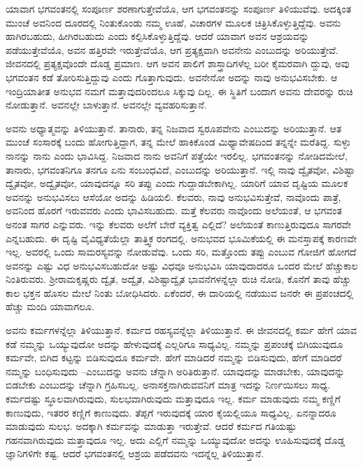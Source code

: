 ಯಾವಾಗ ಭಗವಂತನಲ್ಲಿ ಸಂಪೂರ್ಣ ಶರಣಾಗುತ್ತೇವೆಯೊ, ಆಗ ಭಗವಂತನನ್ನು ಸಂಪೂರ್ಣ ತಿಳಿಯುವೆವು. ಅದಕ್ಕಿಂತ ಮುಂಚೆ ಅವನಿಂದ ದೂರದಲ್ಲಿ ನಿಂತುಕೊಂಡು ನಮ್ಮ ಊಹೆ, ವಿಚಾರಗಳ ಮೂಲಕ ಚಿತ್ರಿಸಿಕೊಳ್ಳುತ್ತಿದ್ದೆವು. ಅವನು ಹಾಗಿರಬಹುದು, ಹೀಗಿರಬಹುದು ಎಂದು ಕಲ್ಪಿಸಿಕೊಳ್ಳುತ್ತಿದ್ದೆವು. ಆದರೆ ಯಾವಾಗ ಅವನ ಆಶ್ರಯವನ್ನು ಪಡೆಯುತ್ತೇವೆಯೊ, ಅವನ ಹತ್ತಿರವೇ ಇರುತ್ತೇವೆಯೊ, ಆಗ ಪ್ರತ್ಯಕ್ಷವಾಗಿ ಅವನೇನು ಎಂಬುದನ್ನು ಅರಿಯುತ್ತೇವೆ. ಜೀವನದಲ್ಲಿ ಪ್ರತ್ಯಕ್ಷವೊಂದೇ ದೊಡ್ಡ ಪ್ರಮಾಣ. ಆಗ ಅವನ ಪಾಲಿಗೆ ಶಾಸ್ತ್ರಾದಿಗಳೆಲ್ಲ ಬರೀ ಕೈಮರವಾಗಿ ದ್ದುವು, ಅವು ಭಗವಂತನ ಕಡೆ ತೋರಿಸುತ್ತಿದ್ದುವು ಎಂದು ಗೊತ್ತಾಗುವುದು. ಅವನೇನೋ ಅದನ್ನು ನಾವು ಅನುಭವಿಸಬೇಕು. ಆ ಇಂದ್ರಿಯಾತೀತ ಅನುಭವ ನಮಗೆ ಮತ್ತಾವುದರಿಂದಲೂ ಸಿಕ್ಕುವು ದಿಲ್ಲ. ಈ ಸ್ಥಿತಿಗೆ ಬಂದಾಗ ಅವನು ದೇವರನ್ನು ರುಚಿ ನೋಡುತ್ತಾನೆ. ಅವನಲ್ಲೇ ಬಾಳುತ್ತಾನೆ. ಅವನಲ್ಲೇ ವ್ಯವಹರಿಸುತ್ತಾನೆ.

ಅವನು ಅಧ್ಯಾತ್ಮವನ್ನು ತಿಳಿಯುತ್ತಾನೆ. ತಾನಾರು, ತನ್ನ ನಿಜವಾದ ಸ್ವರೂಪವೇನು ಎಂಬು\-ದನ್ನು ಅರಿಯುತ್ತಾನೆ. ಆತ ಮುಂಚೆ ಸಂಸಾರಕ್ಕೆ ಬಂದು ಹೋಗುತ್ತಿದ್ದಾಗ, ತನ್ನ ಮೇಲೆ ಹಾಕಿಕೊಂಡ ಮಿಥ್ಯಾವೇಷದಿಂದ ತನ್ನನ್ನೇ ಮರೆತಿದ್ದ. ಸುಳ್ಳು ನಾನನ್ನು ನಾನು ಎಂದು ಭಾವಿಸಿದ್ದ. ನಿಜವಾದ ನಾನು ಅವನಿಗೆ ಪತ್ತೆಯೇ ಇರಲಿಲ್ಲ. ಭಗವಂತನನ್ನು ನೋಡಿದಮೇಲೆ, ತಾನಾರು, ಭಗವಂತನಿಗೂ ತನಗೂ ಏನು ಸಂಬಂಧವಿದೆ, ಎಂಬುದನ್ನು ಅರಿಯುತ್ತಾನೆ. ಇಲ್ಲಿ ನಾವು ದ್ವೈತವೋ, ವಿಶಿಷ್ಟಾ ದ್ವೈತವೋ, ಅದ್ವೈತವೋ, ಯಾವುದನ್ನೂ ಸರಿ ತಪ್ಪು ಎಂದು ಗುದ್ದಾಡಬೇಕಾಗಿಲ್ಲ. ಯಾರಿಗೆ ಯಾವ ದೃಷ್ಟಿಯ ಮೂಲಕ ಅವನನ್ನು ಅನುಭವಿಸಲು ಆಸೆಯೋ ಅದನ್ನು ಹಿಡಿಯಲಿ. ಕೆಲವರು, ನಾವು ಅನುಭವಿಸುತ್ತೇವೆ, ನಾವೊಂದು ಪಾತ್ರೆ, ಅವನಿಂದ ಹೊರಗೆ ಇರುವವರು ಎಂದು ಭಾವಿಸಬಹುದು. ಮತ್ತೆ ಕೆಲವರು ನಾವೊಂದು ಅಲೆಯಂತೆ, ಆ ಭಗವಂತ ಅನಂತ ಸಾಗರ ಎನ್ನುವರು. ಇನ್ನು ಕೆಲವರು ಅಲೆಗೆ ಬೇರೆ ವ್ಯಕ್ತಿತ್ವ ಎಲ್ಲಿದೆ? ಅಲೆಯಂತೆ ಕಾಣುತ್ತಿರುವುದೂ ಸಾಗರವೇ ಎನ್ನಬಹುದು. ಈ ದೃಷ್ಟಿ ವೈವಿಧ್ಯತೆಯೆಲ್ಲಾ ತಾತ್ತ್ವಿಕ ರಂಗದಲ್ಲಿ. ಅನುಭವದ ಭೂಮಿಕೆಯಲ್ಲಿ ಈ ಮನಸ್ತಾಪಕ್ಕೆ ಕಾರಣವೇ ಇಲ್ಲ. ಅವರಲ್ಲಿ ಒಂದು ಸಾಮರಸ್ಯವನ್ನು ನೋಡುವೆವು. ಒಂದು ಸರಿ, ಮತ್ತೊಂದು ತಪ್ಪು ಎಂಬುವ ಗೋಜಿಗೆ ಹೋಗದೆ ಅವನನ್ನು ಎಷ್ಟು ವಿಧ ಅನುಭವಿಸಬಹುದೋ ಅಷ್ಟು ವಿಧವೂ ಅನುಭವಿಸಿ ಯಾವುದಾದರೂ ಒಂದರ ಮೇಲೆ ಹೆಚ್ಚುಕಾಲ ನಿಂತಿರುವರು. ಶ‍್ರೀರಾಮಕೃಷ್ಣರು ದ್ವೈತ, ಅದ್ವೈತ, ವಿಶಿಷ್ಟಾದ್ವೈತ ಭಾವನೆಗಳನ್ನೆಲ್ಲಾ ರುಚಿ ನೋಡಿ, ಕೊನೆಗೆ ತಾವು ಹೆಚ್ಚು ಕಾಲ ಭಕ್ತನ ಹೊಸಲ ಮೇಲೆ ನಿಂತು ಬೋಧಿಸಿದರು. ಏಕೆಂದರೆ, ಈ ದಾರಿಯಲ್ಲಿ ನಡೆಯುವ ಜನರೇ ಈ ಪ್ರಪಂಚದಲ್ಲಿ ಹೆಚ್ಚು ಮಂದಿ ಯಾವಾಗಲೂ.

ಅವನು ಕರ್ಮಗಳನ್ನೆಲ್ಲಾ ತಿಳಿಯುತ್ತಾನೆ. ಕರ್ಮದ ರಹಸ್ಯವನ್ನೆಲ್ಲಾ ತಿಳಿಯುತ್ತಾನೆ. ಈ ಜೀವನದಲ್ಲಿ ಕರ್ಮ ಹೇಗೆ ಯಾವ ಕಡೆ ನಮ್ಮನ್ನು ಒಯ್ಯುವುದೋ ಅದನ್ನು ಹೇಳುವುದಕ್ಕೆ ಎಲ್ಲರಿಗೂ ಸಾಧ್ಯವಿಲ್ಲ. ನಮ್ಮನ್ನು ಪ್ರಪಂಚಕ್ಕೆ ಬಿಗಿಯುವುದೂ ಕರ್ಮವೇ, ಬಿಗಿದ ಕಟ್ಟನ್ನು ಬಿಡಿಸುವುದೂ ಕರ್ಮವೇ. ಹೇಗೆ ಮಾಡಿದರೆ ನಮ್ಮನ್ನು ಬಿಡಿಸುವುದು, ಹೇಗೆ ಮಾಡಿದರೆ ನಮ್ಮನ್ನು ಬಂಧಿಸುವುದು –ಎಂಬುದನ್ನು ಅವನು ಚೆನ್ನಾಗಿ ಅರಿತಿರುತ್ತಾನೆ. ಯಾವುದನ್ನು ಮಾಡಬೇಕು, ಯಾವುದನ್ನು ಬಿಡಬೇಕು ಎಂಬುದನ್ನು ಚೆನ್ನಾಗಿ ಗ್ರಹಿಸಬಲ್ಲ. ಅನಾಸಕ್ತನಾಗಿರುವವನಿಗೆ ಮಾತ್ರ ಇದನ್ನು ನಿರ್ಣಯಿಸಲು ಸಾಧ್ಯ. ಕರ್ಮದಷ್ಟು ಸ್ಥೂಲವಾಗಿರುವುದು, ಸುಲಭವಾಗಿರುವುದು ಮತ್ತಾವುದೂ ಇಲ್ಲ. ಕರ್ಮ ಮಾಡುವುದು ನಮ್ಮ ಕಣ್ಣಿಗೆ ಕಾಣುವುದು, ಇತರರ ಕಣ್ಣಿಗೆ ಕಾಣುವುದು. ತೆಪ್ಪಗೆ ಇರುವುದಕ್ಕೆ ಯಾರ ಕೈಯಲ್ಲಿಯೂ ಸಾಧ್ಯವಿಲ್ಲ. ಏನನ್ನಾದರೂ ಮಾಡುವುದು ಸುಲಭ. ಅದಕ್ಕಾಗಿ ಕರ್ಮವನ್ನು ಮಾಡುತ್ತಾ ಇರುತ್ತೇವೆ. ಆದರೆ ಕರ್ಮದ ಗತಿಯಷ್ಟು ಗಹನವಾಗಿರುವುದು ಮತ್ತಾವುದೂ ಇಲ್ಲ. ಅದು ಎಲ್ಲಿಗೆ ನಮ್ಮನ್ನು ಒಯ್ಯುವುದೋ ಅದನ್ನು ಊಹಿಸುವುದಕ್ಕೆ ದೊಡ್ಡ ಜ್ಞಾನಿಗಳಿಗೇ ಕಷ್ಟ. ಆದರೆ ಭಗವಂತನಲ್ಲಿ ಆಶ್ರಯ ಪಡೆದವನು ಇದನ್ನೆಲ್ಲ ತಿಳಿಯುತ್ತಾನೆ.

